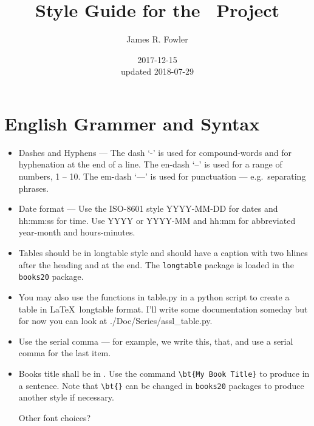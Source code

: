 \documentclass{book}
\begin{document}
\title{Style Guide for the \ProjectTitle\ Project}
\author{James R. Fowler}
\date{2017-12-15\\ updated 2018-07-29}

\maketitle

\tableofcontents

\chapter{English Grammer and Syntax}
\begin{itemize}

\item Dashes and Hyphens --- The dash `-' is used for compound-words and for
  hyphenation at the end of a line.  The en-dash `--' is used for a range
  of numbers, 1 -- 10. The em-dash `---' is used for punctuation ---
  e.g.\ separating phrases.

\item Date format --- Use the ISO-8601\cite{isotime} style
  YYYY-MM-DD for dates and hh:mm:ss for time. Use YYYY or YYYY-MM
  and hh:mm for abbreviated year-month and hours-minutes.

\item Tables should be in longtable style and should have a caption
  with two hlines after the heading and at the end. The
  \texttt{longtable} package is loaded in the \texttt{books20}
  package.

\item You may also use the functions in table.py in a python script to create
  a table in \LaTeX\ longtable format.  I'll write some documentation someday
  but for now you can look at ./Doc/Series/assl\_table.py.

\item Use the serial comma --- for example, we write this, that, and
  use a serial comma for the last item.

\item Books title shall be in . Use the command
  \verb|\bt{My Book Title}| to produce  in a
  sentence. Note that \verb|\bt{}| can be changed in \texttt{books20}
  packages to produce another style if necessary.

 Other font choices?

\end{itemize}
\end{document}
